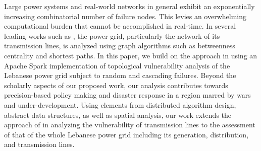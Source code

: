 Large power systems and real-world networks in general exhibit an exponentially increasing combinatorial number of failure nodes. This levies an overwhelming computational burden that cannot be accomplished in real-time. In several leading works such as \cite{2000Natur.406..378A,JinAl10, DaqingAl14}, the power grid, particularly the network of its transmission lines, is analyzed using graph algorithms such as betweenness centrality and shortest paths. 
In this paper, we build on the approach in  \cite{2000Natur.406..378A} using an Apache Spark implementation of topological vulnerability analysis of the Lebanese power grid subject to random  and cascading failures. Beyond the scholarly aspects of our proposed work, our analysis contributes towards precision-based policy making and disaster response in a region marred by wars and under-development. 
Using elements from distributed algorithm design, abstract data structures, as well as spatial analysis, our work extends the approach of \cite{2000Natur.406..378A} in analyzing the vulnerability of transmission lines to the assessment of that of the whole Lebanese power grid including its generation, distribution, and transmission lines. 

